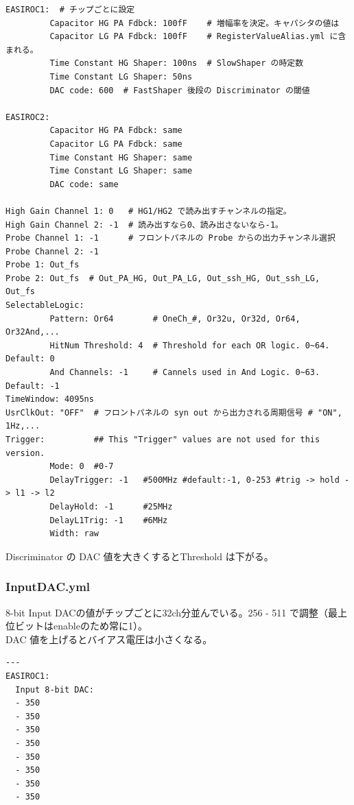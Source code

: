 \documentclass[a4paper]{report}
\begin{document}
\begin{shadebox}
\begin{verbatim}
EASIROC1:  # チップごとに設定
         Capacitor HG PA Fdbck: 100fF    # 増幅率を決定。キャパシタの値は
         Capacitor LG PA Fdbck: 100fF    # RegisterValueAlias.yml に含まれる。
         Time Constant HG Shaper: 100ns  # SlowShaper の時定数
         Time Constant LG Shaper: 50ns
         DAC code: 600  # FastShaper 後段の Discriminator の閾値
 
EASIROC2:
         Capacitor HG PA Fdbck: same
         Capacitor LG PA Fdbck: same
         Time Constant HG Shaper: same
         Time Constant LG Shaper: same
         DAC code: same
 
High Gain Channel 1: 0   # HG1/HG2 で読み出すチャンネルの指定。
High Gain Channel 2: -1  # 読み出すなら0、読み出さないなら-1。
Probe Channel 1: -1      # フロントパネルの Probe からの出力チャンネル選択
Probe Channel 2: -1
Probe 1: Out_fs
Probe 2: Out_fs  # Out_PA_HG, Out_PA_LG, Out_ssh_HG, Out_ssh_LG, Out_fs
SelectableLogic:
         Pattern: Or64        # OneCh_#, Or32u, Or32d, Or64, Or32And,...
         HitNum Threshold: 4  # Threshold for each OR logic. 0~64. Default: 0
         And Channels: -1     # Cannels used in And Logic. 0~63. Default: -1
TimeWindow: 4095ns
UsrClkOut: "OFF"  # フロントパネルの syn out から出力される周期信号 # "ON", 1Hz,...
Trigger:          ## This "Trigger" values are not used for this version.
         Mode: 0  #0-7
         DelayTrigger: -1   #500MHz #default:-1, 0-253 #trig -> hold -> l1 -> l2
         DelayHold: -1      #25MHz
         DelayL1Trig: -1    #6MHz
         Width: raw
\end{verbatim}
\end{shadebox}
Discriminator の DAC 値を大きくするとThreshold は下がる。

\subsubsection{InputDAC.yml}
8-bit Input DACの値がチップごとに32ch分並んでいる。256 - 511 で調整（最上位ビットはenableのため常に1）。\\
DAC 値を上げるとバイアス電圧は小さくなる。
\begin{shadebox}
\begin{verbatim}
---
EASIROC1:
  Input 8-bit DAC:
  - 350
  - 350
  - 350
  - 350
  - 350
  - 350
  - 350
  - 350
\end{verbatim}
\end{shadebox}
\end{document}
